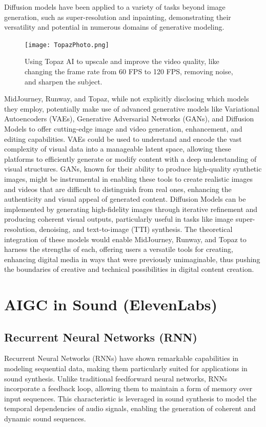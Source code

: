 \documentclass[11pt,a4paper,oneside]{report}
\begin{document}
Diffusion models have been applied to a variety of tasks beyond image generation, such as super-resolution and inpainting, demonstrating their versatility and potential in numerous domains of generative modeling.

\begin{figure}[htbp]
  \centering
  \texttt{[image: TopazPhoto.png]}
  \caption{Using Topaz AI to upscale and improve the video quality, like changing the frame rate from 60 FPS to 120 FPS, removing noise, and sharpen the subject.}
\end{figure}

MidJourney, Runway, and Topaz, while not explicitly disclosing which models they employ, potentially make use of advanced generative models like Variational Autoencoders (VAEs), Generative Adversarial Networks (GANs), and Diffusion Models to offer cutting-edge image and video generation, enhancement, and editing capabilities. 
VAEs could be used to understand and encode the vast complexity of visual data into a manageable latent space, allowing these platforms to efficiently generate or modify content with a deep understanding of visual structures. 
GANs, known for their ability to produce high-quality synthetic images, might be instrumental in enabling these tools to create realistic images and videos that are difficult to distinguish from real ones, enhancing the authenticity and visual appeal of generated content. 
Diffusion Models can be implemented by generating high-fidelity images through iterative refinement and producing coherent visual outputs, particularly useful in tasks like image super-resolution, denoising, and text-to-image (TTI) synthesis. 
The theoretical integration of these models would enable MidJourney, Runway, and Topaz to harness the strengths of each, offering users a versatile tools for creating, enhancing digital media in ways that were previously unimaginable, thus pushing the boundaries of creative and technical possibilities in digital content creation.

\section{AIGC in Sound (ElevenLabs)}

\subsection{Recurrent Neural Networks (RNN)}

Recurrent Neural Networks (RNNs) \cite{srivastava2015unsupervised, chiappa2017recurrent, ha2018world} have shown remarkable capabilities in modeling sequential data, making them particularly suited for applications in sound synthesis. 
Unlike traditional feedforward neural networks, RNNs incorporate a feedback loop, allowing them to maintain a form of memory over input sequences. 
This characteristic is leveraged in sound synthesis to model the temporal dependencies of audio signals, enabling the generation of coherent and dynamic sound sequences.
\end{document}
